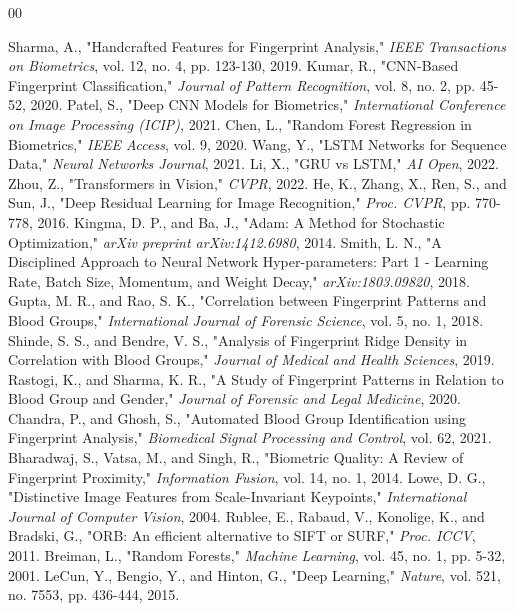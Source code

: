 \documentclass[conference]{IEEEtran}
\begin{document}
\begin{thebibliography}{00}

 Sharma, A., "Handcrafted Features for Fingerprint Analysis," \textit{IEEE Transactions on Biometrics}, vol. 12, no. 4, pp. 123-130, 2019.
 Kumar, R., "CNN-Based Fingerprint Classification," \textit{Journal of Pattern Recognition}, vol. 8, no. 2, pp. 45-52, 2020.
 Patel, S., "Deep CNN Models for Biometrics," \textit{International Conference on Image Processing (ICIP)}, 2021.
 Chen, L., "Random Forest Regression in Biometrics," \textit{IEEE Access}, vol. 9, 2020.
 Wang, Y., "LSTM Networks for Sequence Data," \textit{Neural Networks Journal}, 2021.
 Li, X., "GRU vs LSTM," \textit{AI Open}, 2022.
 Zhou, Z., "Transformers in Vision," \textit{CVPR}, 2022.
 He, K., Zhang, X., Ren, S., and Sun, J., "Deep Residual Learning for Image Recognition," \textit{Proc. CVPR}, pp. 770-778, 2016.
 Kingma, D. P., and Ba, J., "Adam: A Method for Stochastic Optimization," \textit{arXiv preprint arXiv:1412.6980}, 2014.
 Smith, L. N., "A Disciplined Approach to Neural Network Hyper-parameters: Part 1 - Learning Rate, Batch Size, Momentum, and Weight Decay," \textit{arXiv:1803.09820}, 2018.
 Gupta, M. R., and Rao, S. K., "Correlation between Fingerprint Patterns and Blood Groups," \textit{International Journal of Forensic Science}, vol. 5, no. 1, 2018.
 Shinde, S. S., and Bendre, V. S., "Analysis of Fingerprint Ridge Density in Correlation with Blood Groups," \textit{Journal of Medical and Health Sciences}, 2019.
 Rastogi, K., and Sharma, K. R., "A Study of Fingerprint Patterns in Relation to Blood Group and Gender," \textit{Journal of Forensic and Legal Medicine}, 2020.
 Chandra, P., and Ghosh, S., "Automated Blood Group Identification using Fingerprint Analysis," \textit{Biomedical Signal Processing and Control}, vol. 62, 2021.
 Bharadwaj, S., Vatsa, M., and Singh, R., "Biometric Quality: A Review of Fingerprint Proximity," \textit{Information Fusion}, vol. 14, no. 1, 2014.
 Lowe, D. G., "Distinctive Image Features from Scale-Invariant Keypoints," \textit{International Journal of Computer Vision}, 2004.
 Rublee, E., Rabaud, V., Konolige, K., and Bradski, G., "ORB: An efficient alternative to SIFT or SURF," \textit{Proc. ICCV}, 2011.
 Breiman, L., "Random Forests," \textit{Machine Learning}, vol. 45, no. 1, pp. 5-32, 2001.
 LeCun, Y., Bengio, Y., and Hinton, G., "Deep Learning," \textit{Nature}, vol. 521, no. 7553, pp. 436-444, 2015.

\end{thebibliography}
\end{document}
